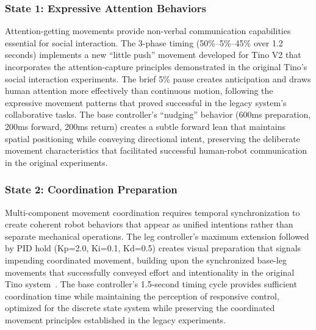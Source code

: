 \subsubsection{State 1: Expressive Attention Behaviors}
Attention-getting movements provide non-verbal communication capabilities essential for social interaction. The 3-phase timing (50\%--5\%--45\% over 1.2 seconds) implements a new ``little push'' movement developed for Tino V2 that incorporates the attention-capture principles demonstrated in the original Tino's social interaction experiments. The brief 5\% pause creates anticipation and draws human attention more effectively than continuous motion, following the expressive movement patterns that proved successful in the legacy system's collaborative tasks. The base controller's ``nudging'' behavior (600ms preparation, 200ms forward, 200ms return) creates a subtle forward lean that maintains spatial positioning while conveying directional intent, preserving the deliberate movement characteristics that facilitated successful human-robot communication in the original experiments.

\subsubsection{State 2: Coordination Preparation}
Multi-component movement coordination requires temporal synchronization to create coherent robot behaviors that appear as unified intentions rather than separate mechanical operations. The leg controller's maximum extension followed by PID hold (Kp=2.0, Ki=0.1, Kd=0.5) creates visual preparation that signals impending coordinated movement, building upon the synchronized base-leg movements that successfully conveyed effort and intentionality in the original Tino system~\cite{cardillo2024thesis}. The base controller's 1.5-second timing cycle provides sufficient coordination time while maintaining the perception of responsive control, optimized for the discrete state system while preserving the coordinated movement principles established in the legacy experiments.

